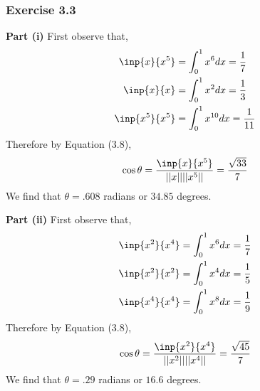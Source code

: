 \documentclass[letterpaper,12pt]{article}
\theoremstyle{definition}
\begin{document}
\subsubsection*{Exercise 3.3}
\textbf{Part (i)}
First observe that,
\begin{align*}
	\inp{x}{x^5} &= \int_0^1 x^6 dx = \frac{1}{7} \\
	\inp{x}{x} &= \int_0^1 x^2 dx = \frac{1}{3} \\
	\inp{x^5}{x^5} &= \int_0^1 x^{10} dx = \frac{1}{11} \\	
\end{align*}
Therefore by Equation (3.8), 
\begin{equation}
	\cos \theta = \frac{\inp{x}{x^5}}{||x||||x^5||} = \frac{\sqrt{33}}{7}
\end{equation}
We find that $\theta = .608$ radians or $34.85$ degrees.

\noindent\textbf{Part (ii)}
First observe that,
\begin{align*}
	\inp{x^2}{x^4} &= \int_0^1 x^6 dx = \frac{1}{7} \\
	\inp{x^2}{x^2} &= \int_0^1 x^4 dx = \frac{1}{5} \\
	\inp{x^4}{x^4} &= \int_0^1 x^{8} dx = \frac{1}{9} \\	
\end{align*}
Therefore by Equation (3.8), 
\begin{equation}
	\cos \theta = \frac{\inp{x^2}{x^4}}{||x^2||||x^4||} = \frac{\sqrt{45}}{7}
\end{equation}
We find that $\theta = .29$ radians or $16.6$ degrees.
\end{document}
